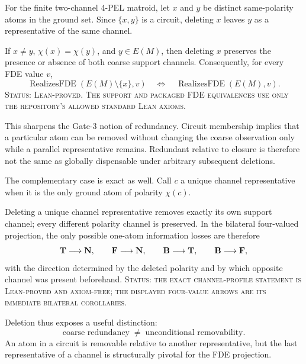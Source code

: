 For the finite two-channel 4-PEL matroid, let \(x\) and \(y\) be distinct
same-polarity atoms in the ground set. Since \(\{x,y\}\) is a circuit, deleting
\(x\) leaves \(y\) as a representative of the same channel.

\begin{proposition}
If \(x\neq y\), \(\chi(x)=\chi(y)\), and \(y\in E(M)\), then deleting \(x\)
preserves the presence or absence of both coarse support channels. Consequently,
for every FDE value \(v\),
\[
  \operatorname{RealizesFDE}(E(M)\setminus\{x\},v)
  \quad\Longleftrightarrow\quad
  \operatorname{RealizesFDE}(E(M),v).
\]
\textup{\textsc{Status: Lean-proved. The support and packaged FDE equivalences
use only the repository's allowed standard Lean axioms.}}
\end{proposition}

This sharpens the Gate-3 notion of redundancy. Circuit membership implies that a
particular atom can be removed without changing the coarse observation only while
a parallel representative remains. Redundant relative to closure is therefore not
the same as globally dispensable under arbitrary subsequent deletions.

The complementary case is exact as well. Call \(c\) a unique channel
representative when it is the only ground atom of polarity \(\chi(c)\).

\begin{proposition}
Deleting a unique channel representative removes exactly its own support channel;
every different polarity channel is preserved. In the bilateral four-valued
projection, the only possible one-atom information losses are therefore
\[
  \mathbf{T}\longrightarrow\mathbf{N},
  \qquad
  \mathbf{F}\longrightarrow\mathbf{N},
  \qquad
  \mathbf{B}\longrightarrow\mathbf{T},
  \qquad
  \mathbf{B}\longrightarrow\mathbf{F},
\]
with the direction determined by the deleted polarity and by which opposite
channel was present beforehand.
\textup{\textsc{Status: the exact channel-profile statement is Lean-proved and
axiom-free; the displayed four-value arrows are its immediate bilateral
corollaries.}}
\end{proposition}

Deletion thus exposes a useful distinction:
\[
  \text{coarse redundancy}
  \;\neq\;
  \text{unconditional removability}.
\]
An atom in a circuit is removable relative to another representative, but the last
representative of a channel is structurally pivotal for the FDE projection.


